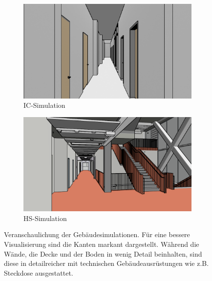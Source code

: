 \begin{figure}
	\centering
	\begin{subfigure}[t]{0.48\linewidth}
		\centering
		\includegraphics[width=\linewidth]{images/syn_dataset/ic00343.png}
		\caption{IC-Simulation}
		\label{subfig:ic_syn_example}
	\end{subfigure}
	\hfill
	\begin{subfigure}[t]{0.48\linewidth}
		\centering
		\includegraphics[width=\linewidth]{images/syn_dataset/hs_gamma02162.png}
		\caption{HS-Simulation}
		\label{subfig:hs_gamma_syn_example}
	\end{subfigure}
	\caption{Veranschaulichung der Gebäudesimulationen. Für eine bessere Visualisierung sind die Kanten markant dargestellt. Während die Wände, die Decke und der Boden in  wenig Detail beinhalten, sind diese in  detailreicher mit technischen Gebäudeausrüstungen wie z.B. Steckdose ausgestattet.}
	\label{fig:difference_3d}
\end{figure} 

